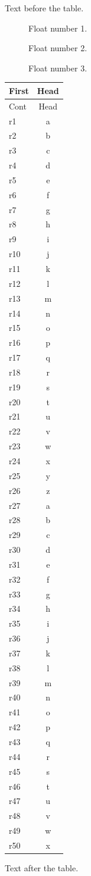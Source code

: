 \documentclass[12pt]{article}
\begin{document}
Text before the table.

\begin{figure}[t]
\caption{Float number 1.}
\end{figure}

\begin{figure}[t]
\caption{Float number 2.}
\end{figure}

\begin{figure}[t]
\caption{Float number 3.}
\end{figure}

\begin{longtable}{lc}
\hline First & Head\\\hline
\endfirsthead
\hline Cont & Head\\\hline
\endhead
\hline
\endfoot
\hline\hline
\endlastfoot
r1 & a\\
r2 & b\\
r3 & c\\
r4 & d\\
r5 & e\\
r6 & f\\
r7 & g\\
r8 & h\\
r9 & i\\
r10 & j\\
r11 & k\\
r12 & l\\
r13 & m\\
r14 & n\\
r15 & o\\
r16 & p\\
r17 & q\\
r18 & r\\
r19 & s\\
r20 & t\\
r21 & u\\
r22 & v\\
r23 & w\\
r24 & x\\
r25 & y\\
r26 & z\\
r27 & a\\
r28 & b\\
r29 & c\\
r30 & d\\
r31 & e\\
r32 & f\\
r33 & g\\
r34 & h\\
r35 & i\\
r36 & j\\
r37 & k\\
r38 & l\\
r39 & m\\
r40 & n\\
r41 & o\\
r42 & p\\
r43 & q\\
r44 & r\\
r45 & s\\
r46 & t\\
r47 & u\\
r48 & v\\
r49 & w\\
r50 & x\\
\end{longtable}

Text after the table.
\end{document}
